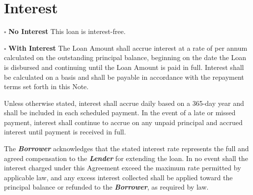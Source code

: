 
\section{Interest}
\label{sec:interest}

$\square$ \textbf{No Interest}
This loan is interest-free.

\vspace{0.3cm}

\noindent $\square$ \textbf{With Interest}
The Loan Amount shall accrue interest at a rate of \LoanInterest{} per annum calculated on the outstanding principal balance, beginning on the date the Loan is disbursed and continuing until the Loan Amount is paid in full. Interest shall be calculated on a \LoanInterestBase{} basis and shall be payable in accordance with the repayment terms set forth in this Note.

\vspace{0.3 cm}

\noindent Unless otherwise stated, interest shall accrue daily based on a 365-day year and shall be included in each scheduled payment. In the event of a late or missed payment, interest shall continue to accrue on any unpaid principal and accrued interest until payment is received in full.

\vspace{0.3 cm}

\noindent The \textbf{\textit{Borrower}} acknowledges that the stated interest rate represents the full and agreed compensation to the \textbf{\textit{Lender}} for extending the loan. In no event shall the interest charged under this Agreement exceed the maximum rate permitted by applicable law, and any excess interest collected shall be applied toward the principal balance or refunded to the \textbf{\textit{Borrower}}, as required by law.

